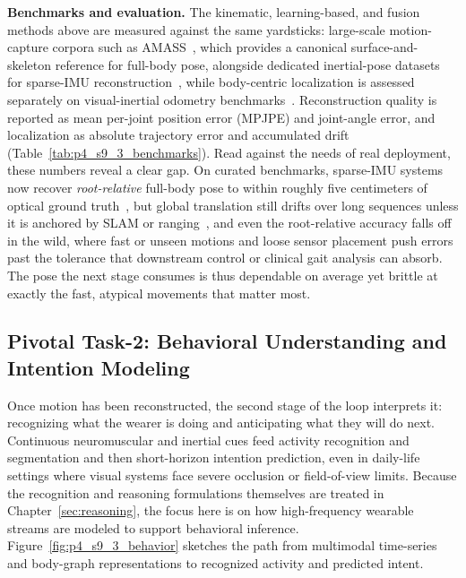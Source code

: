 \textbf{Benchmarks and evaluation.} The kinematic, learning-based, and fusion methods above are measured against the same yardsticks: large-scale motion-capture corpora such as AMASS~\cite{mahmood2019amass}, which provides a canonical surface-and-skeleton reference for full-body pose, alongside dedicated inertial-pose datasets for sparse-IMU reconstruction~\cite{trumble2017totalcapture, huang2018dip}, while body-centric localization is assessed separately on visual-inertial odometry benchmarks~\cite{Schubert2018TUMVI}. Reconstruction quality is reported as mean per-joint position error (MPJPE) and joint-angle error, and localization as absolute trajectory error and accumulated drift (Table~\ref{tab:p4_s9_3_benchmarks}). 
Read against the needs of real deployment, these numbers reveal a clear gap. On curated benchmarks, sparse-IMU systems now recover \emph{root-relative} full-body pose to within roughly five centimeters of optical ground truth~\cite{yi2022pip}, but global translation still drifts over long sequences unless it is anchored by SLAM or ranging~\cite{yi2023egolocate}, and even the root-relative accuracy falls off in the wild, where fast or unseen motions and loose sensor placement push errors past the tolerance that downstream control or clinical gait analysis can absorb. The pose the next stage consumes is thus dependable on average yet brittle at exactly the fast, atypical movements that matter most.


\subsection{Pivotal Task-2: Behavioral Understanding and Intention Modeling}
\label{subsec:p4-sec9-3-pivotal-task-2-behavioral-understanding-and-intention-modeling}

Once motion has been reconstructed, the second stage of the loop interprets it: recognizing what the wearer is doing and anticipating what they will do next. 
Continuous neuromuscular and inertial cues feed activity recognition and segmentation and then short-horizon intention prediction, even in daily-life settings where visual systems face severe occlusion or field-of-view limits. 
Because the recognition and reasoning formulations themselves are treated in Chapter~\ref{sec:reasoning}, the focus here is on how high-frequency wearable streams are modeled to support behavioral inference. 
Figure~\ref{fig:p4_s9_3_behavior} sketches the path from multimodal time-series and body-graph representations to recognized activity and predicted intent.

